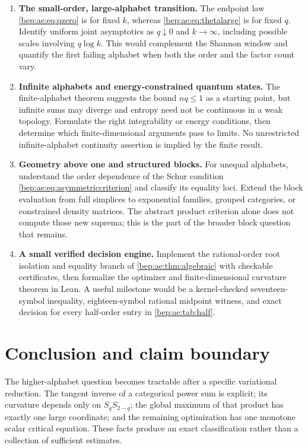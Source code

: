\documentclass[11pt]{article}
\numberwithin{equation}{section}
\theoremstyle{definition}
\theoremstyle{remark}
\begin{document}
\begin{enumerate}[label=\textbf{AQ\arabic*.},leftmargin=3.6em]
\item \textbf{The small-order, large-alphabet transition.}
The endpoint law \eqref{bep:ae:eq:qzero} is for fixed $k$, whereas
\eqref{bep:ae:eq:thetalarge} is for fixed $q$. Identify uniform joint
asymptotics as $q\downarrow0$ and $k\to\infty$, including possible
scales involving $q\log k$. This would complement the Shannon window
and quantify the first failing alphabet when both the order and the
factor count vary.

\item \textbf{Infinite alphabets and energy-constrained quantum states.}
The finite-alphabet theorem suggests the bound $nq\leq1$ as a starting
point, but infinite sums may diverge and entropy need not be continuous
in a weak topology. Formulate the right integrability or energy
conditions, then determine which finite-dimensional arguments pass to
limits. No unrestricted infinite-alphabet continuity assertion is
implied by the finite result.

\item \textbf{Geometry above one and structured blocks.}
For unequal alphabets, understand the order dependence of the Schur
condition \eqref{bep:ae:eq:asymmetriccriterion} and classify its equality
loci. Extend the block evaluation from full simplices to exponential
families, grouped categories, or constrained density matrices. The
abstract product criterion alone does not compute those new suprema;
this is the part of the broader block question that remains.

\item \textbf{A small verified decision engine.}
Implement the rational-order root isolation and equality branch of
\cref{bep:ae:thm:algebraic} with checkable certificates, then formalize the
optimizer and finite-dimensional curvature theorem in Lean. A useful
milestone would be a kernel-checked seventeen-symbol inequality,
eighteen-symbol rational midpoint witness, and exact decision for every
half-order entry in \cref{bep:ae:tab:half}.
\end{enumerate}

\section{Conclusion and claim boundary}\label{bep:ae:sec:conclusion}
The higher-alphabet question becomes tractable after a specific
variational reduction. The tangent inverse of a categorical power sum
is explicit; its curvature depends only on
$S_qS_{2-q}$; the global maximum of that product has exactly one large
coordinate; and the remaining optimization has one monotone scalar
critical equation. These facts produce an exact classification rather
than a collection of sufficient estimates.
\end{document}
